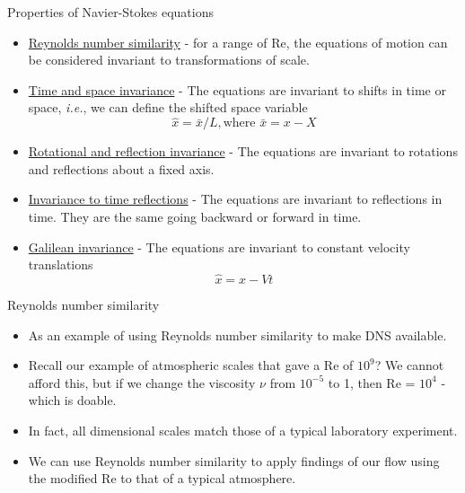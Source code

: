 \begin{frame}{Properties of Navier-Stokes equations}

\begin{itemize}
	\item \underline{Reynolds number similarity} - for a range of Re, the equations of motion can be considered invariant to transformations of scale. 
	\item \underline{Time and space invariance} - The equations are invariant to shifts in time or space, \textit{i.e.}, we can define the shifted space variable $$\hat x = \bar x/L, \text{where } \bar x = x - X$$
	\item \underline{Rotational and reflection invariance} -  The equations are invariant to rotations and reflections about a fixed axis. 
	\item \underline{Invariance to time reflections} - The equations are invariant to reflections in time. They are the same going backward or forward in time.
	\item \underline{Galilean invariance} - The equations are invariant to constant velocity translations
	$$\hat x = x - Vt$$
\end{itemize}
\end{frame}
\begin{frame}{Reynolds number similarity}

\begin{itemize}
	\item As an example of using Reynolds number similarity to make DNS available.
	\item Recall our example of atmospheric scales that gave a Re of $10^9$? We cannot afford this, but if we change the viscosity $\nu$ from $10^{-5}$ to 1, then Re = $10^4$ - which is doable.
	\item In fact, all dimensional scales match those of a typical laboratory experiment.
	\item We can use Reynolds number similarity to apply findings of our flow using the modified Re to that of a typical atmosphere.
\end{itemize}
\end{frame}

